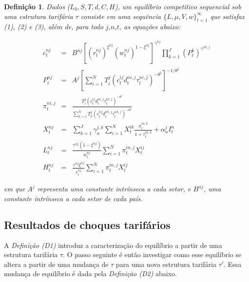 \documentclass{article}
\newtheorem{mydef}{Definição}
\begin{document}
\begin{mydef}\label{def_eq}
Dados ($L_0,S,T,d,C,H$), um equilíbrio competitivo sequencial sob uma estrutura tarifária $\tau$ consiste em uma sequência $\{ L,\mu,V,w \}_{t=1}^{\infty}$ que satisfaz (1), (2) e (3), além de, para todo $j$,$n$,$t$, as equações abaixo:

    \begin{eqnarray}
    c_t^{nj} &=& B^{nj} [(r_t^{nj} )^{\xi^{nj} } (w_t^{nj} )^{1-\xi^{nj}} ]^{\gamma^{nj}} \prod_{k=1}^J (P_t^k) ^ {\gamma ^ {nk,j}} \\
    P_t^{nj} &=& A^j [\sum_{i=1}^N T_i^j (c_t^{ij} d_t^{ni,j} \tau_t^{ni,j} )^{-\theta^j } ] ^ {-1 / \theta^j } \\
    \pi_t^{ni,j} &=& \frac{ T_i^j (c_t^{ij} d_t^{ni,j} \tau_t^{ni,j} )^{-\theta^j } }{ \sum_{h=1}^N T_h^j (c_t^{hj} d_t^{nh,j} \tau_t^{nh,j})^{-\theta^j } } \\
    X_t^{nj} &=& \sum_{k=1}^J \gamma_n^{j,k} \sum_{i=1}^N X_t^{ik} \frac{\pi_t^{in,k}}{1+\tau_t^{in,k}} + \alpha_n^j I_t^n \\
    L_t^{nj} &=& \frac{\gamma^{nj} (1-\xi^{nj})}{w_t^{nj}} \sum_{i=1}^N \pi_{t}^{in,j} X_t^{ij} \\
    H_t^{nj} &=& \frac{\gamma^{nj} \xi^{nj}}{r_t^{nj}} \sum_{i=1}^N \pi_t^{in,j} X_t^{ij} 
    \end{eqnarray}

em que $A^j$ representa uma constante intrínseca a cada setor, e $B^{nj}$, uma constante intrínseca a cada setor de cada país.  
\end{mydef}

\subsection{Resultados de choques tarifários}

A \textit{Definição (D1)} introduz a caracterização do equilíbrio a partir de uma estrutura tarifária $\tau$. O passo seguinte é então investigar como esse equilíbrio se altera a partir de uma mudança de $\tau$ para uma nova estrutura tarifária $\tau'$. Essa mudança de equilíbrio é dada pela \textit{Definição (D2)} abaixo.
\end{document}
